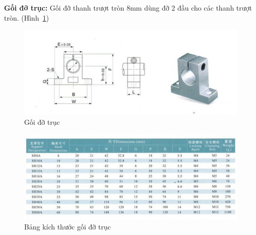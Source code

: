 \textbf{Gối đỡ trục:} Gối đỡ thanh trượt tròn 8mm dùng đỡ 2 đầu cho các thanh trượt tròn. (Hình~\ref{fig:goidotruc})
\begin{center}
    \begin{figure}[htp]
    \begin{center}
     \includegraphics[scale=1]{Chapters/Chapter3/Images/Goidotruc}
    \end{center}
    \caption{Gối đỡ trục}
    \label{fig:goidotruc}
    \end{figure}
\end{center}
\begin{center}
    \begin{figure}[htp]
    \begin{center}
     \includegraphics[scale=1]{Chapters/Chapter3/Images/Kichthuocgoidotruc}
    \end{center}
    \caption{Bảng kích thước gối đỡ trục}
    \label{fig:kichthuocgoidotruc}
    \end{figure}
\end{center}


